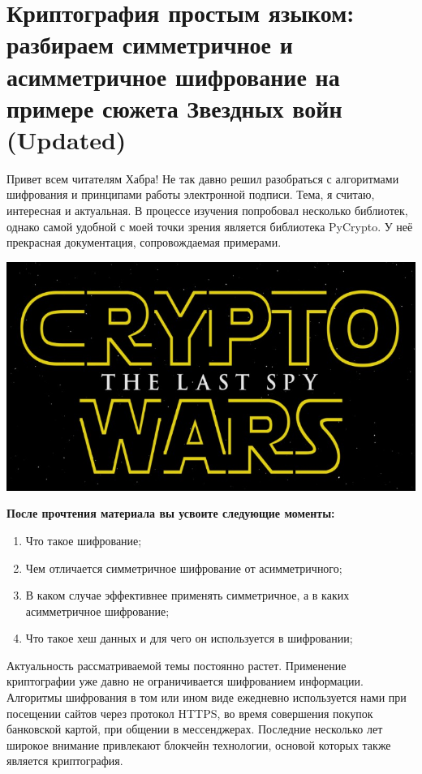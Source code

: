 \documentclass[12pt]{article}
\begin{document}
    \section{Криптография простым языком: разбираем симметричное и асимметричное шифрование на примере сюжета Звездных войн (Updated)}
    
    
    Привет всем читателям Хабра! Не так давно решил разобраться с алгоритмами шифрования и принципами работы электронной подписи. Тема, я считаю, интересная и актуальная. В процессе изучения попробовал несколько библиотек, однако самой удобной с моей точки зрения является библиотека PyCrypto. У неё прекрасная документация, сопровождаемая примерами.
    
    \begin{center}
    \includegraphics[width=1\linewidth]{pictures/img1.jpg}
    \end{center}
    
    
    \textbf{После прочтения материала вы усвоите следующие моменты:}
    
   \begin{enumerate} 
    \item Что такое шифрование;
    \item Чем отличается симметричное шифрование от асимметричного;
    \item В каком случае эффективнее применять симметричное, а в каких асимметричное шифрование;
    \item Что такое хеш данных и для чего он используется в шифровании;
    
\end{enumerate}
    
    
    Актуальность рассматриваемой темы постоянно растет. Применение криптографии уже давно не ограничивается шифрованием информации. Алгоритмы шифрования в том или ином виде ежедневно используется нами при посещении сайтов через протокол HTTPS, во время совершения покупок банковской картой, при общении в мессенджерах. Последние несколько лет широкое внимание привлекают блокчейн технологии, основой которых также является криптография.
    
\end{document}
